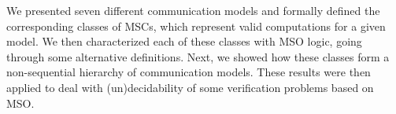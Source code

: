 We presented seven different communication models and formally defined the corresponding classes of MSCs, which represent valid computations for a given model. We then characterized each of these classes with MSO logic, going through some alternative definitions. Next, we showed how these classes form a non-sequential hierarchy of communication models. These results were then applied to deal with (un)decidability of some verification problems based on MSO.